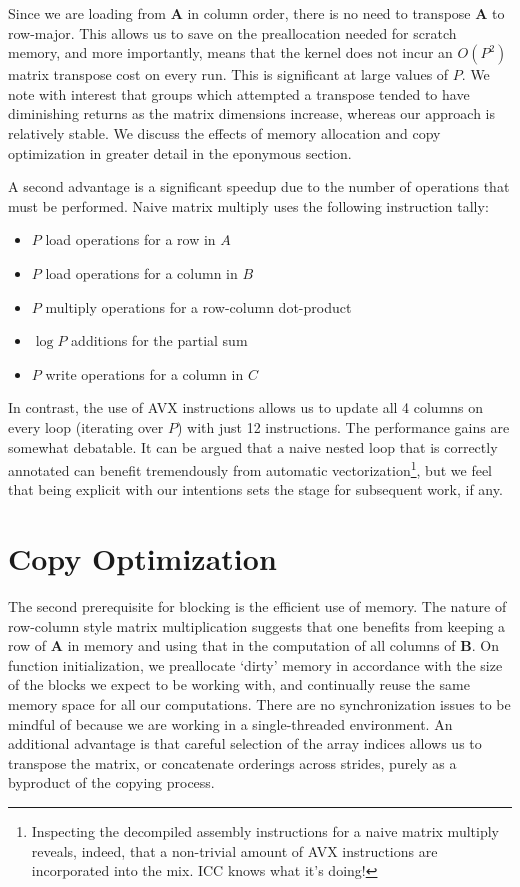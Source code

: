 \documentclass{scrartcl}
\begin{document}
  Since we are loading from $\mathbf{A}$ in column order, there is no need to transpose $\mathbf{A}$ to row-major. This allows us to save on the preallocation needed for scratch memory, and more importantly, means that the kernel does not incur an $O(P^2)$ matrix transpose cost on every run. This is significant at large values of $P$. We note with interest that groups which attempted a transpose tended to have diminishing returns as the matrix dimensions increase, whereas our approach is relatively stable. We discuss the effects of memory allocation and copy optimization in greater detail in the eponymous section.

  A second advantage is a significant speedup due to the number of operations that must be performed. Naive matrix multiply uses the following instruction tally:
  \begin{itemize}
    \item $P$ load operations for a row in $A$
    \item $P$ load operations for a column in $B$
    \item $P$ multiply operations for a row-column dot-product
    \item $\log P$ additions for the partial sum
    \item $P$ write operations for a column in $C$
  \end{itemize}
  In contrast, the use of AVX instructions allows us to update all 4 columns on every loop (iterating over $P$) with just 12 instructions. The performance gains are somewhat debatable. It can be argued that a naive nested loop that is correctly annotated can benefit tremendously from automatic vectorization\footnote{Inspecting the decompiled assembly instructions for a naive matrix multiply reveals, indeed, that a non-trivial amount of AVX instructions are incorporated into the mix. ICC knows what it's doing!}, but we feel that being explicit with our intentions sets the stage for subsequent work, if any.

  \section{Copy Optimization}
  The second prerequisite for blocking is the efficient use of memory. The nature of row-column style matrix multiplication suggests that one benefits from keeping a row of $\mathbf{A}$ in memory and using that in the computation of all columns of $\mathbf{B}$. On function initialization, we preallocate `dirty' memory in accordance with the size of the blocks we expect to be working with, and continually reuse the same memory space for all our computations. There are no synchronization issues to be mindful of because we are working in a single-threaded environment. An additional advantage is that careful selection of the array indices allows us to transpose the matrix, or concatenate orderings across strides, purely as a byproduct of the copying process.
\end{document}
